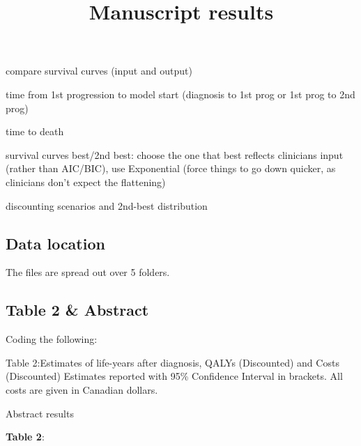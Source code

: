 \documentclass[
]{article}
\title{Manuscript results}
\author{}
\date{\vspace{-2.5em}}
\begin{document}
\maketitle

compare survival curves (input and output)

time from 1st progression to model start (diagnosis to 1st prog or 1st
prog to 2nd prog)

time to death

survival curves best/2nd best: choose the one that best reflects
clinicians input (rather than AIC/BIC), use Exponential (force things to
go down quicker, as clinicians don't expect the flattening)

discounting scenarios and 2nd-best distribution

\hypertarget{data-location}{%
\subsection{Data location}\label{data-location}}

The files are spread out over 5 folders.

\hypertarget{table-2-abstract}{%
\subsection{Table 2 \& Abstract}\label{table-2-abstract}}

Coding the following:

Table 2:Estimates of life-years after diagnosis, QALYs (Discounted) and
Costs (Discounted) Estimates reported with 95\% Confidence Interval in
brackets. All costs are given in Canadian dollars.

Abstract results

\textbf{Table 2}:
\end{document}
